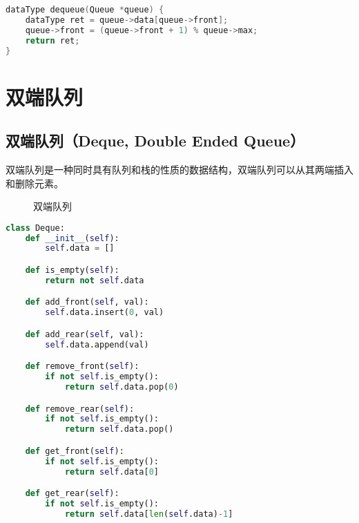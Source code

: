 \vspace{0.5cm}


\begin{lstlisting}[language=C]
dataType dequeue(Queue *queue) {
    dataType ret = queue->data[queue->front];
    queue->front = (queue->front + 1) % queue->max;
    return ret;
}
\end{lstlisting}

\newpage

\section{双端队列}

\subsection{双端队列（Deque, Double Ended Queue）}

双端队列是一种同时具有队列和栈的性质的数据结构，双端队列可以从其两端插入和删除元素。

\begin{figure}[H]
	\centering
	\caption{双端队列}
\end{figure}


\begin{lstlisting}[language=Python]
class Deque:
    def __init__(self):
        self.data = []

    def is_empty(self):
        return not self.data

    def add_front(self, val):
        self.data.insert(0, val)

    def add_rear(self, val):
        self.data.append(val)

    def remove_front(self):
        if not self.is_empty():
            return self.data.pop(0)

    def remove_rear(self):
        if not self.is_empty():
            return self.data.pop()

    def get_front(self):
        if not self.is_empty():
            return self.data[0]

    def get_rear(self):
        if not self.is_empty():
            return self.data[len(self.data)-1]
\end{lstlisting}

\newpage